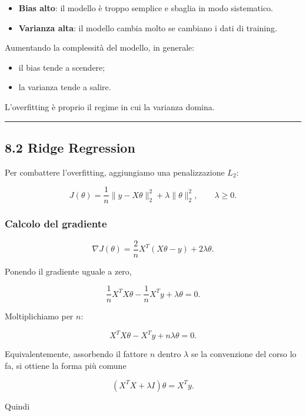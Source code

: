 \documentclass[
]{article}
\providecommand{\tightlist}{%
  \setlength{\itemsep}{0pt}\setlength{\parskip}{0pt}}
\begin{document}
\begin{itemize}
\tightlist
\item
  \textbf{Bias alto}: il modello è troppo semplice e sbaglia in modo
  sistematico.
\item
  \textbf{Varianza alta}: il modello cambia molto se cambiano i dati di
  training.
\end{itemize}

Aumentando la complessità del modello, in generale:

\begin{itemize}
\tightlist
\item
  il bias tende a scendere;
\item
  la varianza tende a salire.
\end{itemize}

L'overfitting è proprio il regime in cui la varianza domina.

\begin{center}\rule{0.5\linewidth}{0.5pt}\end{center}

\subsection{8.2 Ridge Regression}\label{ridge-regression}

Per combattere l'overfitting, aggiungiamo una penalizzazione \(L_2\):

\[
J(\theta)=\frac{1}{n}\|y-X\theta\|_2^2+\lambda\|\theta\|_2^2,
\qquad \lambda\ge 0.
\]

\subsubsection{Calcolo del gradiente}\label{calcolo-del-gradiente}

\[
\nabla J(\theta)
=
\frac{2}{n}X^T(X\theta-y)+2\lambda\theta.
\]

Ponendo il gradiente uguale a zero,

\[
\frac{1}{n}X^TX\theta - \frac{1}{n}X^Ty + \lambda\theta = 0.
\]

Moltiplichiamo per \(n\):

\[
X^TX\theta - X^Ty + n\lambda\theta = 0.
\]

Equivalentemente, assorbendo il fattore \(n\) dentro \(\lambda\) se la
convenzione del corso lo fa, si ottiene la forma più comune

\[
(X^TX+\lambda I)\theta = X^Ty.
\]

Quindi
\end{document}
